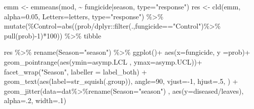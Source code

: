 \documentclass[
  letterpaper,
  DIV=11,
  numbers=noendperiod]{scrreport}
\newenvironment{Shaded}{\begin{snugshade}}{\end{snugshade}}
\newcommand{\AttributeTok}[1]{\textcolor[rgb]{0.40,0.45,0.13}{#1}}
\newcommand{\DecValTok}[1]{\textcolor[rgb]{0.68,0.00,0.00}{#1}}
\newcommand{\FloatTok}[1]{\textcolor[rgb]{0.68,0.00,0.00}{#1}}
\newcommand{\FunctionTok}[1]{\textcolor[rgb]{0.28,0.35,0.67}{#1}}
\newcommand{\NormalTok}[1]{\textcolor[rgb]{0.00,0.23,0.31}{#1}}
\newcommand{\OtherTok}[1]{\textcolor[rgb]{0.00,0.23,0.31}{#1}}
\newcommand{\SpecialCharTok}[1]{\textcolor[rgb]{0.37,0.37,0.37}{#1}}
\newcommand{\StringTok}[1]{\textcolor[rgb]{0.13,0.47,0.30}{#1}}
\begin{document}
\begin{Shaded}
\begin{Highlighting}[]
\NormalTok{emm }\OtherTok{\textless{}{-}} \FunctionTok{emmeans}\NormalTok{(mod, }\SpecialCharTok{\textasciitilde{}}\NormalTok{ fungicide}\SpecialCharTok{|}\NormalTok{season, }\AttributeTok{type=}\StringTok{"response"}\NormalTok{) }
\NormalTok{res }\OtherTok{\textless{}{-}} \FunctionTok{cld}\NormalTok{(emm, }\AttributeTok{alpha=}\FloatTok{0.05}\NormalTok{, }\AttributeTok{Letters=}\NormalTok{letters,  }\AttributeTok{type=}\StringTok{"response"}\NormalTok{) }\SpecialCharTok{\%\textgreater{}\%} 
   \FunctionTok{mutate}\NormalTok{(}\StringTok{\textasciigrave{}}\AttributeTok{\%Control}\StringTok{\textasciigrave{}}\OtherTok{=}\FunctionTok{abs}\NormalTok{((prob}\SpecialCharTok{/}\NormalTok{dplyr}\SpecialCharTok{::}\FunctionTok{filter}\NormalTok{(.,fungicide}\SpecialCharTok{==}\StringTok{"Control"}\NormalTok{)}\SpecialCharTok{\%\textgreater{}\%} \FunctionTok{pull}\NormalTok{(prob)}\SpecialCharTok{{-}}\DecValTok{1}\NormalTok{)}\SpecialCharTok{*}\DecValTok{100}\NormalTok{)) }\SpecialCharTok{\%\textgreater{}\%} 
\NormalTok{  tibble}

\NormalTok{res }\SpecialCharTok{\%\textgreater{}\%} 
  \FunctionTok{rename}\NormalTok{(}\AttributeTok{Season=}\StringTok{"season"}\NormalTok{) }\SpecialCharTok{\%\textgreater{}\%} 
  \FunctionTok{ggplot}\NormalTok{()}\SpecialCharTok{+}
  \FunctionTok{aes}\NormalTok{(}\AttributeTok{x=}\NormalTok{fungicide, }\AttributeTok{y =}\NormalTok{prob)}\SpecialCharTok{+}
  \FunctionTok{geom\_pointrange}\NormalTok{(}\FunctionTok{aes}\NormalTok{(}\AttributeTok{ymin=}\NormalTok{asymp.LCL , }\AttributeTok{ymax=}\NormalTok{asymp.UCL))}\SpecialCharTok{+}
  \FunctionTok{facet\_wrap}\NormalTok{(}\StringTok{"Season"}\NormalTok{, }\AttributeTok{labeller =}\NormalTok{ label\_both) }\SpecialCharTok{+} \FunctionTok{geom\_text}\NormalTok{(}\FunctionTok{aes}\NormalTok{(}\AttributeTok{label=}\FunctionTok{str\_squish}\NormalTok{(.group)), }\AttributeTok{angle=}\DecValTok{90}\NormalTok{, }\AttributeTok{vjust=}\SpecialCharTok{{-}}\DecValTok{1}\NormalTok{, }\AttributeTok{hjust=}\NormalTok{.}\DecValTok{5}\NormalTok{, ) }\SpecialCharTok{+} 
  \FunctionTok{geom\_jitter}\NormalTok{(}\AttributeTok{data=}\NormalTok{dat}\SpecialCharTok{\%\textgreater{}\%}\FunctionTok{rename}\NormalTok{(}\AttributeTok{Season=}\StringTok{"season"}\NormalTok{) , }\FunctionTok{aes}\NormalTok{(}\AttributeTok{y=}\NormalTok{diseased}\SpecialCharTok{/}\NormalTok{leaves), }\AttributeTok{alpha=}\NormalTok{.}\DecValTok{2}\NormalTok{, }\AttributeTok{width=}\NormalTok{.}\DecValTok{1}\NormalTok{)}
\end{Highlighting}
\end{Shaded}
\end{document}
